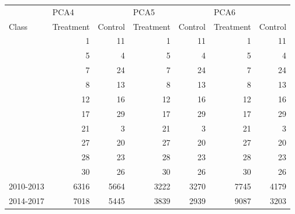 \documentclass{mcmthesis}
\begin{document}
\begin{appendices}
\begin{table}[htbp]
    \begin{tabular}{lrrrrrr}
          & \multicolumn{1}{l}{PCA4} &       & \multicolumn{1}{l}{PCA5} &       & \multicolumn{1}{l}{PCA6} &  \\
    Class & \multicolumn{1}{l}{Treatment} & \multicolumn{1}{l}{Control} & \multicolumn{1}{l}{Treatment} & \multicolumn{1}{l}{Control} & \multicolumn{1}{l}{Treatment} & \multicolumn{1}{l}{Control} \\
          & 1     & 11    & 1     & 11    & 1     & 11 \\
          & 5     & 4     & 5     & 4     & 5     & 4 \\
          & 7     & 24    & 7     & 24    & 7     & 24 \\
          & 8     & 13    & 8     & 13    & 8     & 13 \\
          & 12    & 16    & 12    & 16    & 12    & 16 \\
          & 17    & 29    & 17    & 29    & 17    & 29 \\
          & 21    & 3     & 21    & 3     & 21    & 3 \\
          & 27    & 20    & 27    & 20    & 27    & 20 \\
          & 28    & 23    & 28    & 23    & 28    & 23 \\
          & 30    & 26    & 30    & 26    & 30    & 26 \\
    2010-2013 & 6316  & 5664  & 3222  & 3270  & 7745  & 4179 \\
    2014-2017 & 7018  & 5445  & 3839  & 2939  & 9087  & 3203 \\
    \end{tabular}%
  \label{tab:addlabel}%
\end{table}%
\end{appendices}
\end{document}
